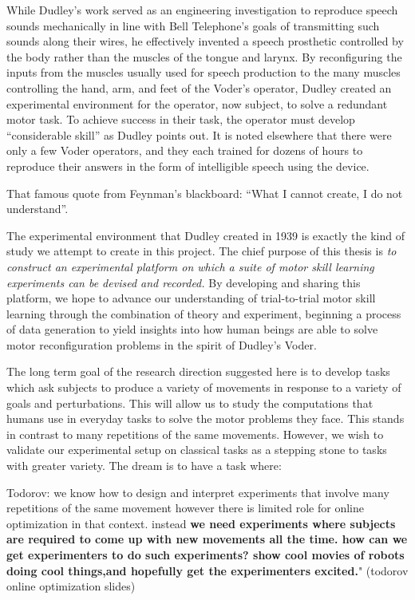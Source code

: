\documentclass[../main.tex]{subfiles}
\begin{document}
\noindent While Dudley's work served as an engineering investigation to reproduce speech sounds mechanically in line with Bell Telephone's goals of transmitting such sounds along their wires, he effectively invented a speech prosthetic controlled by the body rather than the muscles of the tongue and larynx. By reconfiguring the inputs from the muscles usually used for speech production to the many muscles controlling the hand, arm, and feet of the Voder's operator, Dudley created an experimental environment for the operator, now subject, to solve a redundant motor task. To achieve success in their task, the operator must develop ``considerable skill'' as Dudley points out. It is noted elsewhere that there were only a few Voder operators, and they each trained for dozens of hours to reproduce their answers in the form of intelligible speech using the device.

That famous quote from Feynman's blackboard: ``What I cannot create, I do not understand''.

The experimental environment that Dudley created in 1939 is exactly the kind of study we attempt to create in this project. The chief purpose of this thesis is \textit{to construct an experimental platform on which a suite of motor skill learning experiments can be devised and recorded.} By developing and sharing this platform, we hope to advance our understanding of trial-to-trial motor skill learning through the combination of theory and experiment, beginning a process of data generation to yield insights into how human beings are able to solve motor reconfiguration problems in the spirit of Dudley's Voder.

The long term goal of the research direction suggested here is to develop tasks which ask subjects to produce a variety of movements in response to a variety of goals and perturbations. This will allow us to study the computations that humans use in everyday tasks to solve the motor problems they face. This stands in contrast to many repetitions of the same movements. However, we wish to validate our experimental setup on classical tasks as a stepping stone to tasks with greater variety. The dream is to have a task where: 

Todorov: we know how to design and interpret experiments that involve many repetitions of the same movement however there is limited role for online optimization in that context. instead \textbf{we need experiments where subjects are required to come up with new movements all the time. how can we get experimenters to do such experiments? show cool movies of robots doing cool things,and hopefully get the experimenters excited.}" (todorov online optimization slides)
\end{document}
